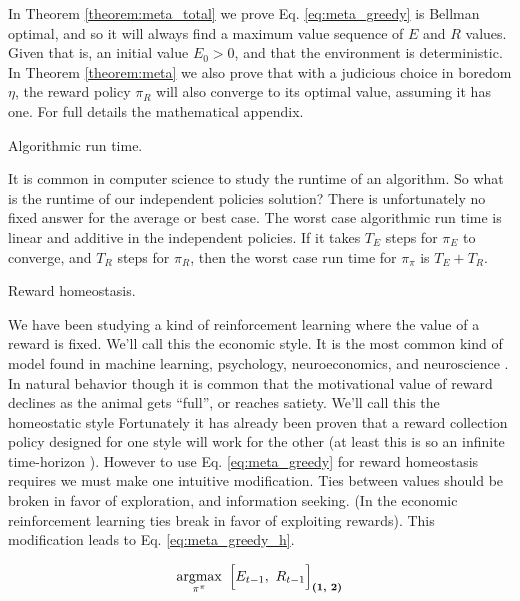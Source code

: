 In Theorem \ref{theorem:meta_total} we prove Eq. \ref{eq:meta_greedy} is Bellman optimal, and so it will always find a maximum value sequence of $E$ and $R$ values. Given that is, an initial value $E_0 > 0$, and that the environment is deterministic. In Theorem \ref{theorem:meta} we also prove that with a judicious choice in boredom $\eta$, the reward policy $\pi_R$ will also converge to its optimal value, assuming it has one. For full details the mathematical appendix.


\begin{featurebox}
	\caption{Algorithmic run time.}
	\label{box:complexity}
	It is common in computer science to study the runtime of an algorithm. So what is the runtime of our independent policies solution? There is unfortunately no fixed answer for the average or best case. The worst case algorithmic run time is linear and additive in the independent policies. If it takes $T_E$ steps for $\pi_E$ to converge, and $T_R$ steps for $\pi_R$, then the worst case run time for $\pi_{\pi}$ is $T_E + T_R$. 
	\medskip
\end{featurebox}

\begin{featurebox}
	\caption{Reward homeostasis.}
	\label{box:complexity}
	We have been studying a kind of reinforcement learning where the value of a reward is fixed. We'll call this the economic style. It is the most common kind of model found in machine learning, psychology, neuroeconomics, and neuroscience \cite{Sutton2018}. In natural behavior though it is common that the motivational value of reward declines as the animal gets ``full'', or reaches satiety. We'll call this the homeostatic style \cite{Keramati2014,Juechems2019,Munch2020}
	Fortunately it has already been proven that a reward collection policy designed for one style will work for the other (at least this is so an infinite time-horizon \cite{Keramati2014}). However to use Eq. \ref{eq:meta_greedy} for reward homeostasis requires we must make one intuitive modification. Ties between values should be broken in favor of exploration, and information seeking. (In the economic reinforcement learning ties break in favor of exploiting rewards). This modification leads to Eq. \ref{eq:meta_greedy_h}.

	\begin{equation}
		\label{eq:meta_greedy_h} 
			\operatorname*{argmax}_{\pi^{\pi}} \ \Big [ E_{t-1},\ R_{t-1} \Big ]_{\textbf{(1, 2)}}
		\end{equation}
	\medskip
\end{featurebox}

